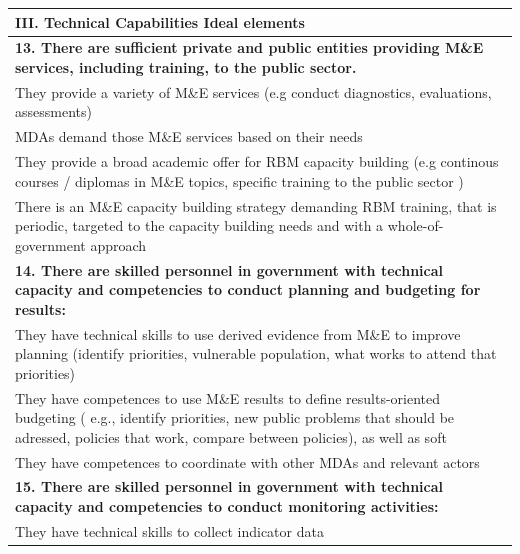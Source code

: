 \documentclass[
  10pt,
]{book}
\begin{document}
\begin{table}
\centering
\begin{tabular}[t]{l}
\hline
III. Technical Capabilities Ideal elements\\
\hline
\multicolumn{1}{l}{\textbf{13. There are sufficient private and public entities providing M\&E services, including training, to the public sector.}}\\
\hline
\hspace{1em}They provide a variety of M\&E services (e.g conduct diagnostics, evaluations, assessments)\\
\hline
\hspace{1em}MDAs demand those M\&E services based on their needs\\
\hline
\hspace{1em}They provide a broad academic offer for RBM capacity building (e.g continous courses / diplomas in M\&E topics, specific training to the public sector )\\
\hline
\hspace{1em}There is an M\&E capacity building strategy demanding RBM training, that is periodic, targeted to the capacity building needs and with a whole-of-government approach\\
\hline
\multicolumn{1}{l}{\textbf{14. There are skilled personnel in government with technical capacity and competencies to conduct planning and budgeting for results:}}\\
\hline
\hspace{1em}They have technical skills to use derived evidence from M\&E to improve planning (identify priorities, vulnerable population, what works to attend that priorities)\\
\hline
\hspace{1em}They have competences to use M\&E results to define results-oriented budgeting ( e.g., identify priorities, new public problems that should be adressed, policies that work, compare between policies), as well as soft\\
\hline
\hspace{1em}They have competences to coordinate with other MDAs and relevant actors\\
\hline
\multicolumn{1}{l}{\textbf{15. There are skilled personnel in government with technical capacity and competencies to conduct monitoring activities:}}\\
\hline
\hspace{1em}They have technical skills to collect indicator data\\

\end{tabular}
\end{table}
\end{document}

